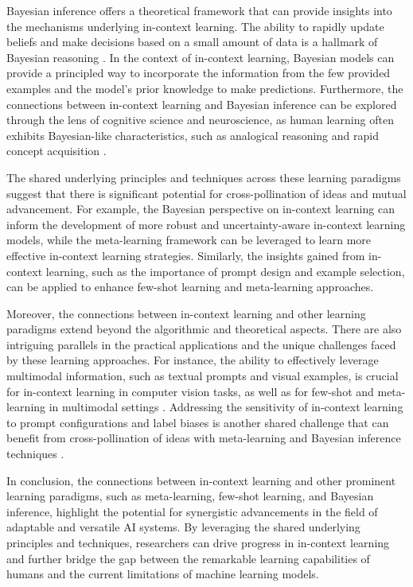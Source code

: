 \documentclass[11pt]{article}
\begin{document}
Bayesian inference offers a theoretical framework that can provide insights into the mechanisms underlying in-context learning. The ability to rapidly update beliefs and make decisions based on a small amount of data is a hallmark of Bayesian reasoning \cite{ref32}. In the context of in-context learning, Bayesian models can provide a principled way to incorporate the information from the few provided examples and the model's prior knowledge to make predictions. Furthermore, the connections between in-context learning and Bayesian inference can be explored through the lens of cognitive science and neuroscience, as human learning often exhibits Bayesian-like characteristics, such as analogical reasoning and rapid concept acquisition \cite{ref29}.

The shared underlying principles and techniques across these learning paradigms suggest that there is significant potential for cross-pollination of ideas and mutual advancement. For example, the Bayesian perspective on in-context learning can inform the development of more robust and uncertainty-aware in-context learning models, while the meta-learning framework can be leveraged to learn more effective in-context learning strategies. Similarly, the insights gained from in-context learning, such as the importance of prompt design and example selection, can be applied to enhance few-shot learning and meta-learning approaches.

Moreover, the connections between in-context learning and other learning paradigms extend beyond the algorithmic and theoretical aspects. There are also intriguing parallels in the practical applications and the unique challenges faced by these learning approaches. For instance, the ability to effectively leverage multimodal information, such as textual prompts and visual examples, is crucial for in-context learning in computer vision tasks, as well as for few-shot and meta-learning in multimodal settings \cite{ref33}. Addressing the sensitivity of in-context learning to prompt configurations and label biases is another shared challenge that can benefit from cross-pollination of ideas with meta-learning and Bayesian inference techniques \cite{ref34}.

In conclusion, the connections between in-context learning and other prominent learning paradigms, such as meta-learning, few-shot learning, and Bayesian inference, highlight the potential for synergistic advancements in the field of adaptable and versatile AI systems. By leveraging the shared underlying principles and techniques, researchers can drive progress in in-context learning and further bridge the gap between the remarkable learning capabilities of humans and the current limitations of machine learning models.
\end{document}
